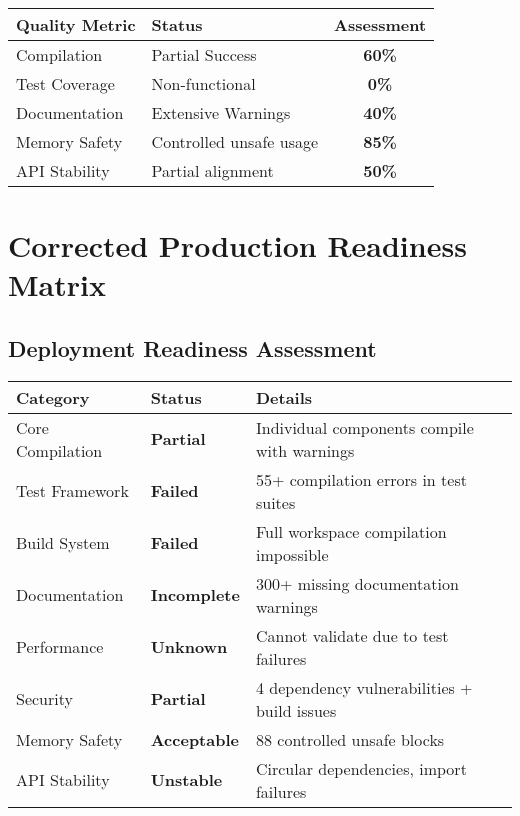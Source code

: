 \documentclass[11pt,a4paper]{article}
\newcommand{\critical}[1]{\textcolor{criticalred}{\textbf{#1}}}
\newcommand{\warning}[1]{\textcolor{warningorange}{\textbf{#1}}}
\newcommand{\success}[1]{\textcolor{successgreen}{\textbf{#1}}}
\newcommand{\info}[1]{\textcolor{infoblue}{\textbf{#1}}}
\begin{document}
\begin{center}
\begin{tabular}{|l|l|c|}
\hline
\textbf{Quality Metric} & \textbf{Status} & \textbf{Assessment} \\
\hline
Compilation & Partial Success & \warning{60\%} \\
Test Coverage & Non-functional & \critical{0\%} \\
Documentation & Extensive Warnings & \warning{40\%} \\
Memory Safety & Controlled unsafe usage & \success{85\%} \\
API Stability & Partial alignment & \warning{50\%} \\
\hline
\end{tabular}
\end{center}

\section{Corrected Production Readiness Matrix}

\subsection{Deployment Readiness Assessment}

\begin{longtable}{|p{3cm}|p{3cm}|p{8cm}|}
\hline
\textbf{Category} & \textbf{Status} & \textbf{Details} \\
\hline
\endhead

Core Compilation & \warning{Partial} & Individual components compile with warnings \\
\hline
Test Framework & \critical{Failed} & 55+ compilation errors in test suites \\
\hline
Build System & \critical{Failed} & Full workspace compilation impossible \\
\hline
Documentation & \warning{Incomplete} & 300+ missing documentation warnings \\
\hline
Performance & \info{Unknown} & Cannot validate due to test failures \\
\hline
Security & \warning{Partial} & 4 dependency vulnerabilities + build issues \\
\hline
Memory Safety & \success{Acceptable} & 88 controlled unsafe blocks \\
\hline
API Stability & \critical{Unstable} & Circular dependencies, import failures \\
\hline
\end{longtable}
\end{document}
